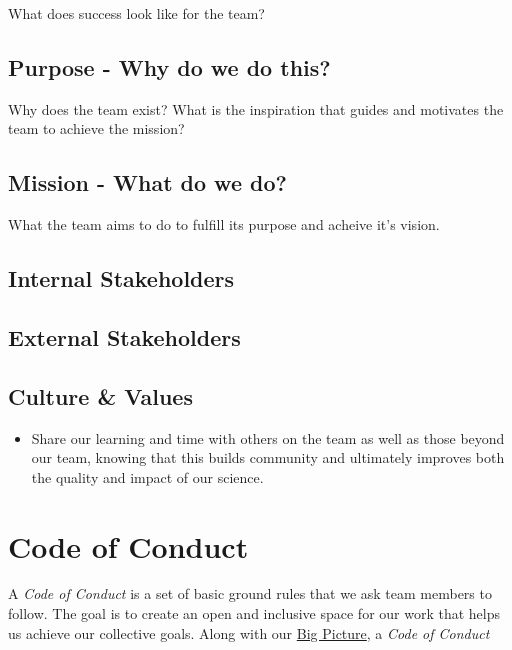 \documentclass[
  letterpaper,
  DIV=11,
  numbers=noendperiod]{scrreprt}
\providecommand{\tightlist}{%
  \setlength{\itemsep}{0pt}\setlength{\parskip}{0pt}}\usepackage{longtable,booktabs,array}
\begin{document}
What does success look like for the team?

\hypertarget{purpose---why-do-we-do-this}{%
\section{Purpose - Why do we do
this?}\label{purpose---why-do-we-do-this}}

Why does the team exist? What is the inspiration that guides and
motivates the team to achieve the mission?

\hypertarget{mission---what-do-we-do}{%
\section{Mission - What do we do?}\label{mission---what-do-we-do}}

What the team aims to do to fulfill its purpose and acheive it's vision.

\hypertarget{internal-stakeholders}{%
\section{Internal Stakeholders}\label{internal-stakeholders}}

\hypertarget{external-stakeholders}{%
\section{External Stakeholders}\label{external-stakeholders}}

\hypertarget{culture-values}{%
\section{Culture \& Values}\label{culture-values}}

\begin{itemize}
\tightlist
\item
  Share our learning and time with others on the team as well as those
  beyond our team, knowing that this builds community and ultimately
  improves both the quality and impact of our science.
\end{itemize}


\hypertarget{code}{%
\chapter{Code of Conduct}\label{code}}

A \emph{Code of Conduct} is a set of basic ground rules that we ask team
members to follow. The goal is to create an open and inclusive space for
our work that helps us achieve our collective goals. Along with our
\protect\hyperlink{sec-big_picture}{Big Picture}, a \emph{Code of
Conduct}
\end{document}
